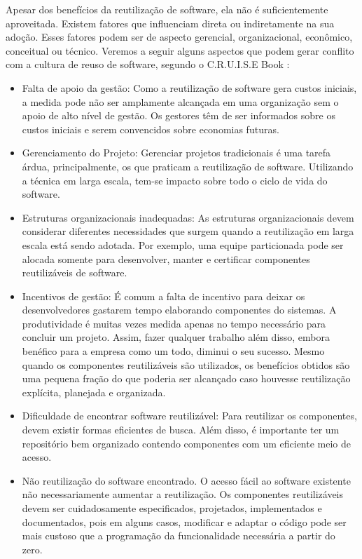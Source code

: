 Apesar dos benefícios da reutilização de software, ela não é suficientemente aproveitada. Existem fatores que influenciam direta ou indiretamente na sua adoção. Esses fatores podem ser de aspecto gerencial, organizacional, econômico, conceitual ou técnico. Veremos a seguir alguns aspectos que podem gerar conflito com a cultura de reuso de software, segundo o C.R.U.I.S.E Book \citep{cruise2007} :

\begin{itemize}
	
\item Falta de apoio da gestão: Como a reutilização de software gera custos iniciais,
a medida pode não ser amplamente alcançada em uma organização sem o apoio de alto nível de gestão. Os gestores têm de ser informados sobre os custos iniciais e serem convencidos sobre economias futuras.

\item Gerenciamento do Projeto: Gerenciar projetos tradicionais é uma tarefa árdua, principalmente, os que praticam a reutilização de software. Utilizando a técnica em larga escala, tem-se impacto sobre todo o ciclo de vida do software.

\item Estruturas organizacionais inadequadas: As estruturas organizacionais devem
considerar diferentes necessidades que surgem quando a reutilização em larga escala está sendo adotada. Por exemplo, uma equipe particionada pode ser alocada somente para desenvolver, manter e certificar componentes reutilizáveis de software.

\item Incentivos de gestão: É comum a falta de incentivo para deixar os desenvolvedores gastarem tempo elaborando componentes do sistemas. A produtividade é muitas vezes medida apenas no tempo necessário para concluir um projeto. Assim, fazer qualquer trabalho além disso, embora benéfico para a empresa como um todo, diminui o seu sucesso. Mesmo quando os componentes reutilizáveis são utilizados, os benefícios obtidos são uma pequena fração do que poderia ser alcançado caso houvesse reutilização explícita, planejada e organizada.

\item Dificuldade de encontrar software reutilizável: Para reutilizar os componentes, devem existir formas eficientes de busca. Além disso, é importante ter um repositório bem organizado contendo componentes com um eficiente meio de acesso.

\item Não reutilização do software encontrado. O acesso fácil ao software existente
não necessariamente aumentar a reutilização. Os componentes reutilizáveis devem ser cuidadosamente especificados, projetados, implementados e documentados, pois em alguns casos, modificar e adaptar o código  pode ser mais custoso que a programação da funcionalidade necessária a partir do zero.


\end{itemize}
